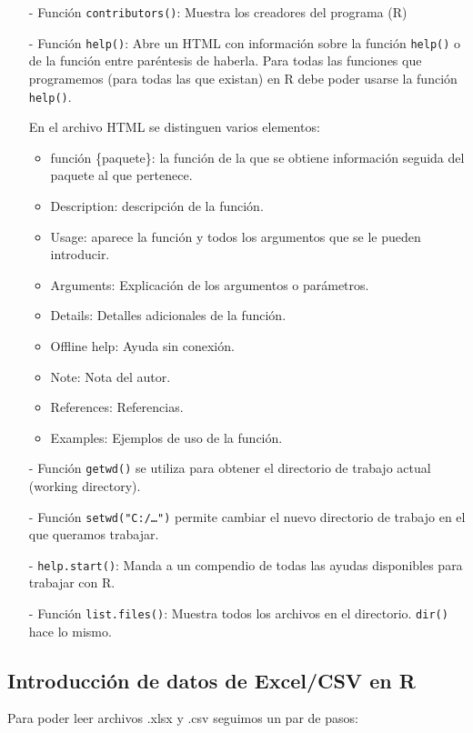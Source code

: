 \documentclass[a4paper, 12pt]{article}
\begin{document}
	\begin{itemize}
		\item[-]Función \texttt{contributors()}: Muestra los creadores del programa (R)
		
		\item[-]Función \texttt{help()}: Abre un HTML con información sobre la función \texttt{help()} o de la función entre paréntesis de haberla. Para todas las funciones que programemos (para todas las que existan) en R debe poder usarse la función \texttt{help()}.
		
		En el archivo HTML se distinguen varios elementos:
		
		\begin{itemize}
			\item función \{paquete\}: la función de la que se obtiene información seguida del paquete al que pertenece.
			\item Description: descripción de la función.
			\item Usage: aparece la función y todos los argumentos que se le pueden introducir.
			\item Arguments: Explicación de los argumentos o parámetros.
			\item Details: Detalles adicionales de la función.
			\item Offline help: Ayuda sin conexión.
			\item Note: Nota del autor.
			\item References: Referencias.
			\item Examples: Ejemplos de uso de la función.
		\end{itemize}
		
		\item[-]Función \texttt{getwd()} se utiliza para obtener el directorio de trabajo actual (working directory).
		
		\item[-]Función \texttt{setwd(\string"C:/…")} permite cambiar el nuevo directorio de trabajo en el que queramos trabajar.
		
		\item[-] \texttt{help.start()}: Manda a un compendio de todas las ayudas disponibles para trabajar con R.
		
		\item[-]Función \texttt{list.files()}: Muestra todos los archivos en el directorio. \texttt{dir()} hace lo mismo. 
	\end{itemize}
	
	\subsection{Introducción de datos de Excel/CSV en R}
	Para poder leer archivos .xlsx y .csv seguimos un par de pasos:
\end{document}
